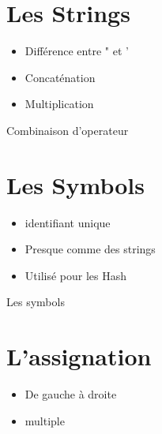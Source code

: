 \documentclass{beamer}
\begin{document}
\section{Les Strings}

\begin{frame}
  \begin{itemize}
    \item Diff\'erence entre " et '
    \item Concat\'enation
    \item Multiplication
  \end{itemize}
\end{frame}

\begin{frame}
  \begin{beamerboxesrounded}{Combinaison d'operateur}
    
  \end{beamerboxesrounded}
\end{frame}

\section{Les Symbols}

\begin{frame}
  \begin{itemize}
    \item identifiant unique
    \item Presque comme des strings
    \item Utilis\'e  pour les Hash
  \end{itemize}
\end{frame}

\begin{frame}
  \begin{beamerboxesrounded}{Les symbols}
    
  \end{beamerboxesrounded}
\end{frame}


\section{L'assignation}

\begin{frame}
  \begin{itemize}
    \item De gauche à droite
    \item multiple
  \end{itemize}
\end{frame}
\end{document}
